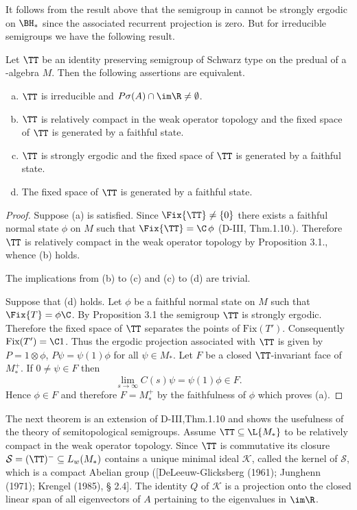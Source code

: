 It follows from the result above that the semigroup in \citet{evans:1977} cannot be strongly ergodic on $\BH_{*}$ since the associated recurrent projection is zero.
But for irreducible semigroups we have the following result.
%
\begin{proposition}\label{prop:d4-3.4}
Let $\TT$ be an identity preserving semigroup of Schwarz type on the predual of a \WA-algebra $M$.
Then the following assertions are equivalent.
\begin{enumerate}[(a)]
\item
$\TT$ is irreducible and $P\sigma(A) \cap \im\R \neq \emptyset$.

\item
$\TT$ is relatively compact in the weak operator topology and the fixed space of\/ $\TT$ is generated by a faithful state.

\item
$\TT$ is strongly ergodic and the fixed space of\/ $\TT$ is generated by a faithful state.

\item
The fixed space of\/ $\TT$ is generated by a faithful state.
\end{enumerate}
\end{proposition}
\begin{proof}
Suppose (a) is satisfied.
Since $\Fix{\TT} \neq \{0\}$ there exists a faithful normal state $\phi$ on $M$ such that $\Fix{\TT} = \C \,\phi$ (D-III, Thm.1.10.).
Therefore $\TT$ is relatively compact in the weak operator topology by Proposition 3.1., whence (b) holds.

The implications from (b) to (c) and (c) to (d) are trivial.

Suppose that (d) holds.
Let $\phi$ be a faithful normal state on $M$ such that $\Fix{T} = \phi\C$.
By Proposition 3.1 the semigroup $\TT$ is strongly ergodic.
Therefore the fixed space of\/ $\TT$ separates the points of $\text{Fix}(T')$.
Consequently $\text{Fix}(T') = \C1$.
Thus the ergodic projection associated with $\TT$ is given by $P = 1 \otimes \phi$, \ie $P\psi = \psi(1)\phi$ for all $\psi \in M_{*}$.
Let $F$ be a closed $\TT$-invariant face of $M_{*}^{+}$.
If $0 \neq \psi \in F$ then
\[
\lim_{s \to \infty} C(s)\psi = \psi(1)\phi \in F.
\]
Hence $\phi \in F$ and therefore $F = M_{*}^{+}$ by the faithfulness of $\phi$ which proves (a).
\end{proof}
The next theorem is an extension of D-III,Thm.1.10 and shows the usefulness of the theory of semitopological semigroups.
Assume $\TT \subseteq \L{M_{*}}$ to be relatively compact in the weak operator topology.
Since $\TT$ is commutative its closure $\mathcal{S}  = (\TT)^{-} \subseteq L_{w}(M_{*})$ contains a unique minimal ideal $\mathcal{K}$, called the kernel of $\mathcal{S}$, which is a compact Abelian group ([DeLeeuw-Glicksberg (1961); Junghenn (1971); Krengel (1985), § 2.4].
The identity $Q$ of $\mathcal{K}$ is a projection onto the closed linear span of all eigenvectors of $ A $ pertaining to the eigenvalues in $ \im \R $.

